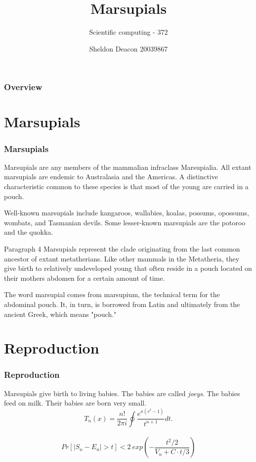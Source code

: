 \documentclass{beamer}
\title{Marsupials}
\subtitle{Scientific computing - 372}
\author{Sheldon Deacon 20039867}
\institute{Stellenbosch University}
\begin{document}
\begin{frame}
	\titlepage
\end{frame}
\begin{frame}
	\frametitle{Overview}
	\tableofcontents[currentsection]
\end{frame}
\section{Marsupials}
\begin{frame}

\frametitle{Marsupials}
	Marsupials are any members of the mammalian infraclass Marsupialia.
	\newline \newline
	All extant marsupials are endemic to Australasia and the Americas. 
	A distinctive characteristic common to these species is that most of
	the young are carried in a pouch.
\end{frame}

\begin{frame}
	Well-known marsupials include kangaroos, wallabies, koalas, possums, 
	opossums, wombats, and Tasmanian devils. Some lesser-known marsupials
	are the potoroo and the quokka.
	
	\begin{block}{Paragraph 4}
		Marsupials represent the clade originating from the last common 
		ancestor of extant metatherians. Like other mammals in the 
		Metatheria, they give birth to relatively undeveloped young that 
		often reside in a pouch located on their mothers abdomen for a
		certain amount of time.
	\end{block}

	The word marsupial comes from marsupium, the technical term for the
	abdominal pouch. It, in turn, is borrowed from Latin and ultimately from
	the ancient Greek, which means "pouch."
\end{frame}
\section{Reproduction}
\begin{frame}
	\frametitle{Reproduction}
	Marsupials give birth to living babies. The babies are called \textit{joeys}. 
	The babies feed on milk. Their babies are born very small.
 	\begin{equation*}
		T_n(x) = \frac{n!}{2\pi i} \oint \frac{e^{x(e^t-1)}}{t^{n+1}}dt.
	\end{equation*}
 	\\
	\begin{equation*}
		Pr[|S_n - E_n| > t] < 2 \ exp \left( -\frac{t^2/2}{V_n+C\cdot t/3} \right)
	\end{equation*}
\end{frame}
\end{document}
